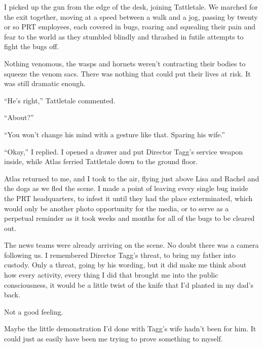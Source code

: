 I picked up the gun from the edge of the desk, joining Tattletale.  We marched for the exit together, moving at a speed between a walk and a jog, passing by twenty or so PRT employees, each covered in bugs, roaring and squealing their pain and fear to the world as they stumbled blindly and thrashed in futile attempts to fight the bugs off.



Nothing venomous, the wasps and hornets weren't contracting their bodies to squeeze the venom sacs.  There was nothing that could put their lives at risk.  It was still dramatic enough.



``He's right,'' Tattletale commented.



``About?''



``You won't change his mind with a gesture like that.  Sparing his wife.''



``Okay,'' I replied.  I opened a drawer and put Director Tagg's service weapon inside, while Atlas ferried Tattletale down to the ground floor.



Atlas returned to me, and I took to the air, flying just above Lisa and Rachel and the dogs as we fled the scene.  I made a point of leaving every single bug inside the PRT headquarters, to infest it until they had the place exterminated, which would only be another photo opportunity for the media, or to serve as a perpetual reminder as it took weeks and months for all of the bugs to be cleared out.



The news teams were already arriving on the scene.  No doubt there was a camera following us.  I remembered Director Tagg's threat, to bring my father into custody.  Only a threat, going by his wording, but it did make me think about how every activity, every thing I did that brought me into the public consciousness, it would be a little twist of the knife that I'd planted in my dad's back.



Not a good feeling.



Maybe the little demonstration I'd done with Tagg's wife hadn't been for him.  It could just as easily have been me trying to prove something to myself.





